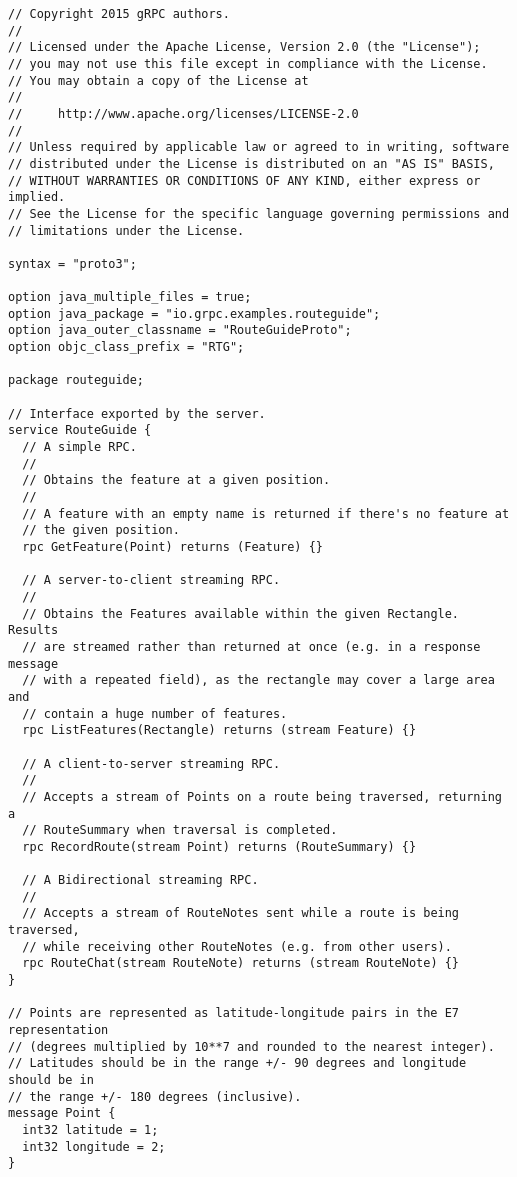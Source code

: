 \begin{verbatim}
// Copyright 2015 gRPC authors.
//
// Licensed under the Apache License, Version 2.0 (the "License");
// you may not use this file except in compliance with the License.
// You may obtain a copy of the License at
//
//     http://www.apache.org/licenses/LICENSE-2.0
//
// Unless required by applicable law or agreed to in writing, software
// distributed under the License is distributed on an "AS IS" BASIS,
// WITHOUT WARRANTIES OR CONDITIONS OF ANY KIND, either express or implied.
// See the License for the specific language governing permissions and
// limitations under the License.

syntax = "proto3";

option java_multiple_files = true;
option java_package = "io.grpc.examples.routeguide";
option java_outer_classname = "RouteGuideProto";
option objc_class_prefix = "RTG";

package routeguide;

// Interface exported by the server.
service RouteGuide {
  // A simple RPC.
  //
  // Obtains the feature at a given position.
  //
  // A feature with an empty name is returned if there's no feature at
  // the given position.
  rpc GetFeature(Point) returns (Feature) {}

  // A server-to-client streaming RPC.
  //
  // Obtains the Features available within the given Rectangle. Results
  // are streamed rather than returned at once (e.g. in a response message
  // with a repeated field), as the rectangle may cover a large area and
  // contain a huge number of features.
  rpc ListFeatures(Rectangle) returns (stream Feature) {}

  // A client-to-server streaming RPC.
  //
  // Accepts a stream of Points on a route being traversed, returning a
  // RouteSummary when traversal is completed.
  rpc RecordRoute(stream Point) returns (RouteSummary) {}

  // A Bidirectional streaming RPC.
  //
  // Accepts a stream of RouteNotes sent while a route is being traversed,
  // while receiving other RouteNotes (e.g. from other users).
  rpc RouteChat(stream RouteNote) returns (stream RouteNote) {}
}

// Points are represented as latitude-longitude pairs in the E7 representation
// (degrees multiplied by 10**7 and rounded to the nearest integer).
// Latitudes should be in the range +/- 90 degrees and longitude should be in
// the range +/- 180 degrees (inclusive).
message Point {
  int32 latitude = 1;
  int32 longitude = 2;
}


\end{verbatim}
